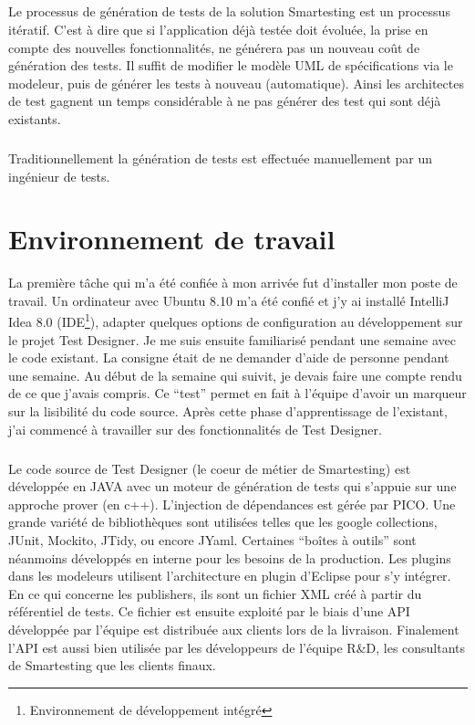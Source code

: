 \subparagraph*{}
Le processus de génération de tests de la solution Smartesting est un processus itératif. C'est à dire que si l'application déjà testée doit évoluée, la prise en compte des nouvelles fonctionnalités, ne générera pas un nouveau coût de génération des tests. 
Il suffit de modifier le modèle UML de spécifications via le modeleur, puis de générer les tests à nouveau (automatique). Ainsi les architectes de test gagnent un temps considérable à ne pas générer des test qui sont déjà existants.

\subparagraph*{}
Traditionnellement la génération de tests est effectuée manuellement par un ingénieur de tests.

\section{Environnement de travail}
La première tâche qui m'a été confiée à mon arrivée fut d'installer mon poste de travail. Un ordinateur avec Ubuntu 8.10 m'a été confié et j'y ai installé IntelliJ Idea 8.0 (IDE\footnote{Environnement de développement intégré}), adapter quelques options de configuration au développement sur le projet Test Designer. Je me suis ensuite familiarisé pendant une semaine avec le code existant. La consigne était de ne demander d'aide de personne pendant une semaine. Au début de la semaine qui suivit, je devais faire une compte rendu de ce que j'avais compris. Ce ``test'' permet en fait à l'équipe d'avoir un  marqueur sur la lisibilité du code source. Après cette phase d'apprentissage de l'existant, j'ai commencé à travailler sur des fonctionnalités de Test Designer.

\subparagraph*{}
Le code source de Test Designer (le coeur de métier de Smartesting) est développée en JAVA avec un moteur de génération de tests qui s'appuie sur une approche prover (en c++). L'injection de dépendances est gérée par PICO. Une grande variété de bibliothèques sont utilisées telles que les google collections, JUnit, Mockito, JTidy, ou encore JYaml. Certaines ``boîtes à outils'' sont néanmoins développés en interne pour les besoins de la production. Les plugins dans les modeleurs utilisent l'architecture en plugin d'Eclipse pour s'y intégrer. En ce qui concerne les publishers, ils sont un fichier XML créé à partir du référentiel de tests. Ce fichier est ensuite exploité par le biais d'une API développée par l'équipe est distribuée aux clients lors de la livraison. Finalement l'API est aussi bien utilisée par les développeurs de l'équipe R\&D, les consultants de Smartesting que les clients finaux.
